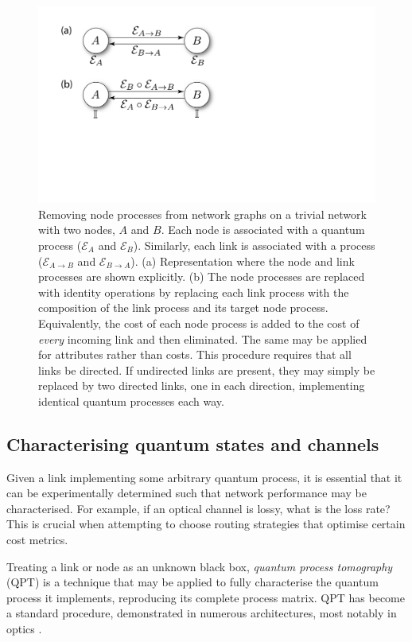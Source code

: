 \documentclass[aps, rmp, twocolumn, amsmath, amssymb, nofootinbib, superscriptaddress, longbibliography, floatfix, table-of-contents, eqsecnum]{revtex4-1}
\begin{document}
\begin{figure}[!htb]
\includegraphics[width=0.7\columnwidth]{remove_nodes}
\caption{Removing node processes from network graphs on a trivial network with two nodes, $A$ and $B$. Each node is associated with a quantum process ($\mathcal{E}_A$ and $\mathcal{E}_B$). Similarly, each link is associated with a process ($\mathcal{E}_{A\to B}$ and $\mathcal{E}_{B\to A}$). (a) Representation where the node and link processes are shown explicitly. (b) The node processes are replaced with identity operations by replacing each link process with the composition of the link process and its target node process. Equivalently, the cost of each node process is added to the cost of \textit{every} incoming link and then eliminated. The same may be applied for attributes rather than costs. This procedure requires that all links be directed. If undirected links are present, they may simply be replaced by two directed links, one in each direction, implementing identical quantum processes each way.} \label{fig:remove_nodes}
\end{figure}

%
%

\subsection{Characterising quantum states and channels} \label{sec:QPT}

Given a link implementing some arbitrary quantum process, it is essential that it can be experimentally determined such that network performance may be characterised. For example, if an optical channel is lossy, what is the loss rate? This is crucial when attempting to choose routing strategies that optimise certain cost metrics.

Treating a link or node as an unknown black box, \textit{quantum process tomography} (QPT) \cite{bib:ChuangNielsen97, ???} is a technique that may be applied to fully characterise the quantum process it implements, reproducing its complete process matrix. QPT has become a standard procedure, demonstrated in numerous architectures, most notably in optics \cite{bib:OBrien04, bib:RohdeGateChar05}.
\end{document}
